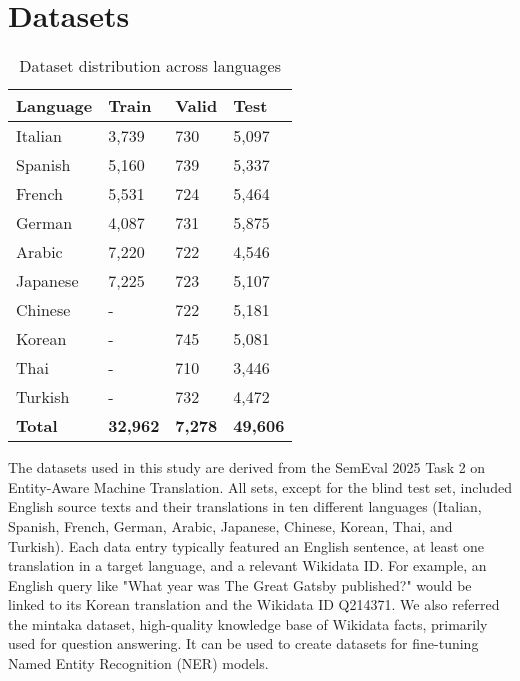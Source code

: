 \documentclass{ecai}
\begin{document}
\section{Datasets}
\label{sec:datasets}

\begin{table}[h!]
\centering
\begin{tabular}{ll@{\hspace{8mm}}ll}
\hline
\textbf{Language} & \textbf{Train} & \textbf{Valid} & \textbf{Test} \\
\hline
Italian & 3,739 & 730 & 5,097 \\
Spanish & 5,160 & 739 & 5,337 \\
French & 5,531 & 724 & 5,464 \\
German & 4,087 & 731 & 5,875 \\
Arabic & 7,220 & 722 & 4,546 \\
Japanese & 7,225 & 723 & 5,107 \\
Chinese & - & 722 & 5,181 \\
Korean & - & 745 & 5,081 \\
Thai & - & 710 & 3,446 \\
Turkish & - & 732 & 4,472 \\
\hline
\textbf{Total} & \textbf{32,962} & \textbf{7,278} & \textbf{49,606} \\
\hline
\end{tabular}
\caption{Dataset distribution across languages}
\label{tab:dataset_distribution}
\end{table}

The datasets used in this study are derived from the SemEval 2025 Task 2 on Entity-Aware Machine Translation.
All sets, except for the blind test set, included English source texts and their translations in ten 
different languages (Italian, Spanish, French, German, Arabic, Japanese, Chinese, Korean, Thai, and Turkish). 
Each data entry typically featured an English sentence, at least one translation in a target language, 
and a relevant Wikidata ID. 
For example, an English query like "What year was The Great Gatsby published?" 
would be linked to its Korean translation and the Wikidata ID Q214371. We also referred the mintaka\cite{sen-etal-2022-mintaka} dataset,
high-quality knowledge base of Wikidata facts, primarily used for question answering. It can be used to create
datasets for fine-tuning Named Entity Recognition (NER) models.

\end{document}
